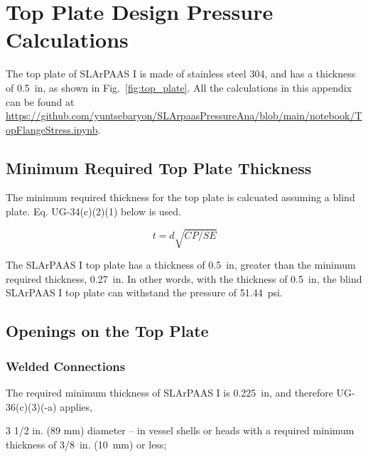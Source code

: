 \section{Top Plate Design Pressure Calculations}
\label{app:top_plate}

The top plate of SLArPAAS I is made of stainless steel 304, and has
a thickness of 0.5~in, as shown in Fig.~\ref{fig:top_plate}.
All the calculations in this appendix can be found
at \url{https://github.com/yuntsebaryon/SLArpaasPressureAna/blob/main/notebook/TopFlangeStress.ipynb}.

\subsection{Minimum Required Top Plate Thickness}
\label{app:blind_flange}

The minimum required thickness for the top plate is calcuated assuming
a blind plate.  Eq. UG-34(c)(2)(1) below is used.

\begin{equation}
    t= d\sqrt{CP/SE}
\end{equation}



The SLArPAAS I top plate has a thickness of 0.5~in, greater than the minimum
required thickness, 0.27~in.
In other words, with the thickness of 0.5~in, the blind SLArPAAS I top plate
can withstand the pressure of 51.44~psi.

\subsection{Openings on the Top Plate}
\label{app:openings}

\subsubsection{Welded Connections}
\label{app:welded}

The required minimum thickness of SLArPAAS I is 0.225~in, and therefore
UG-36(c)(3)(-a) applies,

\begin{displayquote}
    3 1/2 in. (89 mm) diameter -- in vessel shells or heads with a 
    required minimum thickness of 3/8~in. (10~mm) or less;
\end{displayquote}

